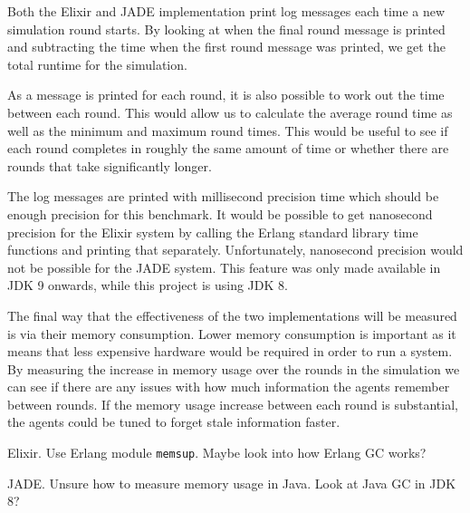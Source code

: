 Both the Elixir and JADE implementation print log messages each time a new simulation round starts.
By looking at when the final round message is printed and subtracting the time when the first round message was printed, we get the total runtime for the simulation.

As a message is printed for each round, it is also possible to work out the time between each round.
This would allow us to calculate the average round time as well as the minimum and maximum round times.
This would be useful to see if each round completes in roughly the same amount of time or whether there are rounds that take significantly longer.

The log messages are printed with millisecond precision time which should be enough precision for this benchmark.
It would be possible to get nanosecond precision for the Elixir system by calling the Erlang standard library time functions and printing that separately.
Unfortunately, nanosecond precision would not be possible for the JADE system.
This feature was only made available in JDK 9 onwards, while this project is using JDK 8.

The final way that the effectiveness of the two implementations will be measured is via their memory consumption.
Lower memory consumption is important as it means that less expensive hardware would be required in order to run a system.
By measuring the increase in memory usage over the rounds in the simulation we can see if there are any issues with how much information the agents remember between rounds.
If the memory usage increase between each round is substantial, the agents could be tuned to forget stale information faster.

Elixir.
Use Erlang module \verb|memsup|.
Maybe look into how Erlang GC works?

JADE\@.
Unsure how to measure memory usage in Java.
Look at Java GC in JDK 8?
